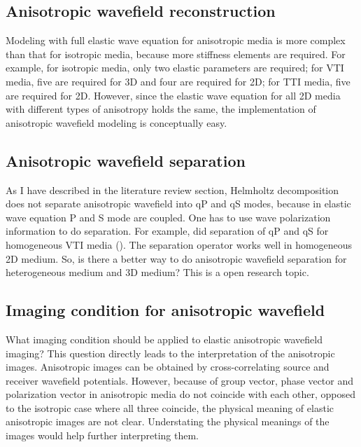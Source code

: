 



\subsection{Anisotropic wavefield reconstruction}
Modeling with full elastic wave equation for anisotropic media is more complex than that for isotropic media, because more stiffness elements are required. For example, for isotropic media, only two elastic parameters are required; for VTI media, five are required for 3D and four are required for 2D; for TTI media, five are required for 2D. However, since the elastic wave equation for all 2D media with different types of anisotropy holds the same, the implementation of anisotropic wavefield modeling is conceptually easy.

\subsection{Anisotropic wavefield separation}
As I have described in the literature review section, Helmholtz decomposition does not separate anisotropic wavefield into qP and qS modes, because in elastic wave equation P and S mode are coupled. One has to use wave polarization information to do separation. For example, \cite[]{GEO55-07-09140919} did separation of qP and qS for homogeneous VTI media (). The separation operator works well in homogeneous 2D medium. So, is there a better way to do anisotropic wavefield separation for heterogeneous medium and 3D medium? This is a open research topic.

\subsection{Imaging condition for anisotropic wavefield}
What imaging condition should be applied to elastic anisotropic wavefield imaging? This question directly leads to the interpretation of the anisotropic images. 
Anisotropic images can be obtained by cross-correlating source and receiver wavefield potentials. However, because of group vector, phase vector and polarization vector in anisotropic media do not coincide with each other, opposed to the isotropic case where all three coincide, the physical meaning of elastic anisotropic images are not clear. Understating the physical meanings of the images would help further interpreting them.

